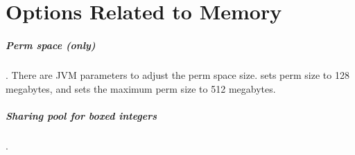 \chapter{\jre Options Related to Memory}
\label{chapter:jre-options}

\paragraph{Perm space (\oracle only)}. There are JVM parameters to adjust
the perm space size.  sets perm size to 128 megabytes,
and  sets the maximum perm size to 512 megabytes.

\paragraph{Sharing pool for boxed integers}. 
